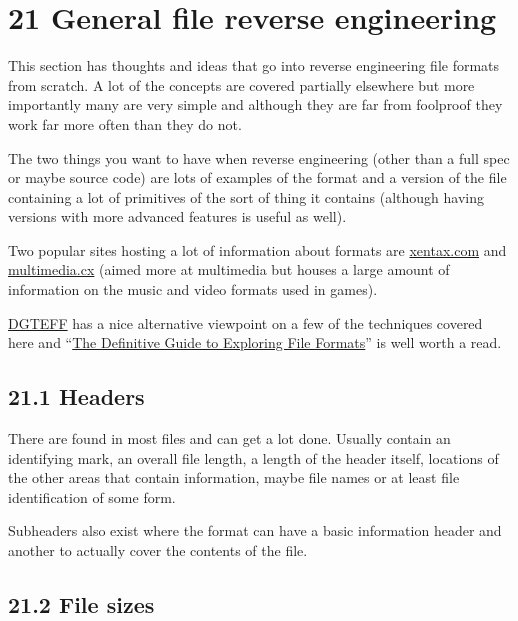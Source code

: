 \documentclass[
]{book}
\begin{document}
\hypertarget{general-file-reverse-engineering}{%
\chapter{21 General file reverse engineering}\label{general-file-reverse-engineering}}

This section has thoughts and ideas that go into reverse engineering file formats from scratch. A lot of the concepts are covered partially elsewhere but more importantly many are very simple and although they are far from foolproof they work far more often than they do not.

The two things you want to have when reverse engineering (other than a full spec or maybe source code) are lots of examples of the format and a version of the file containing a lot of primitives of the sort of thing it contains (although having versions with more advanced features is useful as well).

Two popular sites hosting a lot of information about formats are \href{http://wiki.xentax.com/index.php/Game_File_Format_Central}{xentax.com} and \href{http://wiki.multimedia.cx/index.php?title=Main_Page}{multimedia.cx} (aimed more at multimedia but houses a large amount of information on the music and video formats used in games).

\href{http://wiki.xentax.com/index.php?title=DGTEFF}{DGTEFF} has a nice alternative viewpoint on a few of the techniques covered here and ``\href{http://www.romhacking.net/docs/464/}{The Definitive Guide to Exploring File Formats}'' is well worth a read.

\hypertarget{headers}{%
\section{21.1 Headers}\label{headers}}

There are found in most files and can get a lot done. Usually contain an identifying mark, an overall file length, a length of the header itself, locations of the other areas that contain information, maybe file names or at least file identification of some form.

Subheaders also exist where the format can have a basic information header and another to actually cover the contents of the file.

\hypertarget{file-sizes}{%
\section{21.2 File sizes}\label{file-sizes}}
\end{document}
